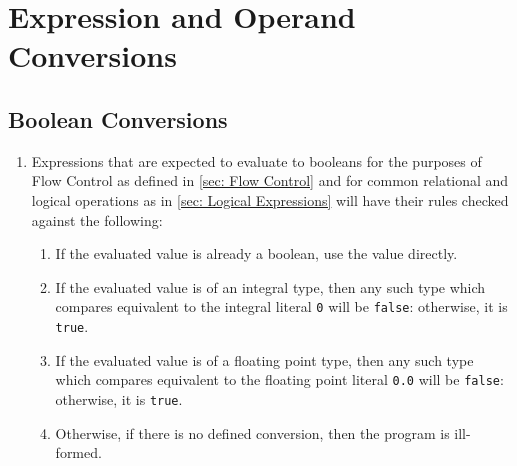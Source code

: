 \section{Expression and Operand Conversions}

\subsection{Boolean Conversions}
\begin{enumerate}
	\item Expressions that are expected to evaluate to booleans for the purposes of Flow Control as defined in \ref{sec: Flow Control} and for common relational and logical operations as in \ref{sec: Logical Expressions} will have their rules checked against the following:
	\begin{enumerate}
		\item If the evaluated value is already a boolean, use the value directly.
		\item If the evaluated value is of an integral type, then any such type which compares equivalent to the integral literal \lstinline|0| will be \lstinline|false|: otherwise, it is \lstinline|true|.
		\item If the evaluated value is of a floating point type, then any such type which compares equivalent to the floating point literal \lstinline|0.0| will be \lstinline|false|: otherwise, it is \lstinline|true|.
		\item Otherwise, if there is no defined conversion, then the program is ill-formed.
	\end{enumerate}
\end{enumerate}

